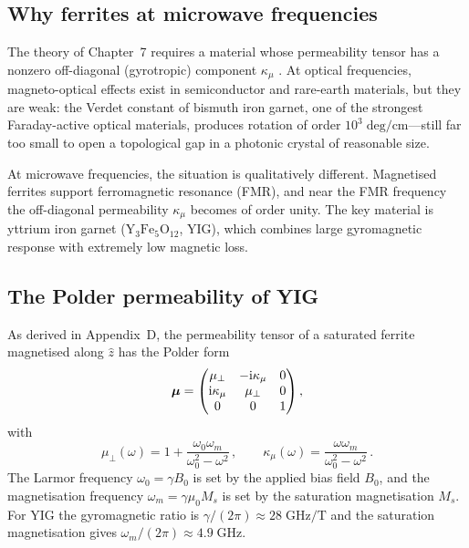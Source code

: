 \subsection{Why ferrites at microwave frequencies}
\label{sec:ch9-why-ferrites}

The theory of Chapter~7 requires a material whose permeability tensor
has a nonzero off-diagonal (gyrotropic) component $\kappa_\mu$
\cite{haldane2008reflection}.  At
optical frequencies, magneto-optical effects exist in semiconductor and
rare-earth materials, but they are weak: the Verdet constant of
bismuth iron garnet, one of the strongest Faraday-active optical
materials, produces rotation of order $10^3\;\mathrm{deg/cm}$---still
far too small to open a topological gap in a photonic crystal of
reasonable size.

At microwave frequencies, the situation is qualitatively different.
Magnetised ferrites support ferromagnetic resonance (FMR), and near
the FMR frequency the off-diagonal permeability $\kappa_\mu$ becomes
of order unity.  The key material is yttrium iron garnet
($\mathrm{Y_3Fe_5O_{12}}$, YIG), which combines large gyromagnetic
response with extremely low magnetic loss.

\subsection{The Polder permeability of YIG}
\label{sec:ch9-polder}

As derived in Appendix~D, the permeability tensor of a saturated ferrite
magnetised along $\hat{z}$ has the Polder form
\cite{gangaraj2016berry,he2016photonic}
\begin{equation}\label{eq:ch9-polder}
  \boldsymbol{\mu} = \begin{pmatrix}
    \mu_\perp & -\mathrm{i}\kappa_\mu & 0 \\
    \mathrm{i}\kappa_\mu & \mu_\perp & 0 \\
    0 & 0 & 1
  \end{pmatrix},
\end{equation}
with
\begin{equation}\label{eq:ch9-polder-params}
  \mu_\perp(\omega) = 1 + \frac{\omega_0\omega_m}{\omega_0^2 - \omega^2}\,,
  \qquad
  \kappa_\mu(\omega) = \frac{\omega\omega_m}{\omega_0^2 - \omega^2}\,.
\end{equation}
The Larmor frequency $\omega_0=\gamma B_0$ is set by the applied bias
field $B_0$, and the magnetisation frequency
$\omega_m=\gamma\mu_0 M_s$ is set by the saturation magnetisation
$M_s$.  For YIG the gyromagnetic ratio is
$\gamma/(2\pi)\approx 28\;\mathrm{GHz/T}$ and the saturation
magnetisation gives $\omega_m/(2\pi)\approx 4.9\;\mathrm{GHz}$.

